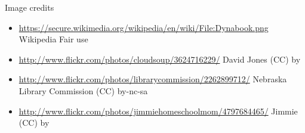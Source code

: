 \begin{frame}{Image credits}
  \tiny
  \begin{itemize}
    \item \url{https://secure.wikimedia.org/wikipedia/en/wiki/File:Dynabook.png} Wikipedia Fair use
    \item \url{http://www.flickr.com/photos/cloudsoup/3624716229/} David Jones (CC) by
    \item \url{http://www.flickr.com/photos/librarycommission/2262899712/} Nebraska Library Commission (CC) by-nc-sa
    \item \url{http://www.flickr.com/photos/jimmiehomeschoolmom/4797684465/} Jimmie (CC) by
  \end{itemize}
\end{frame}
